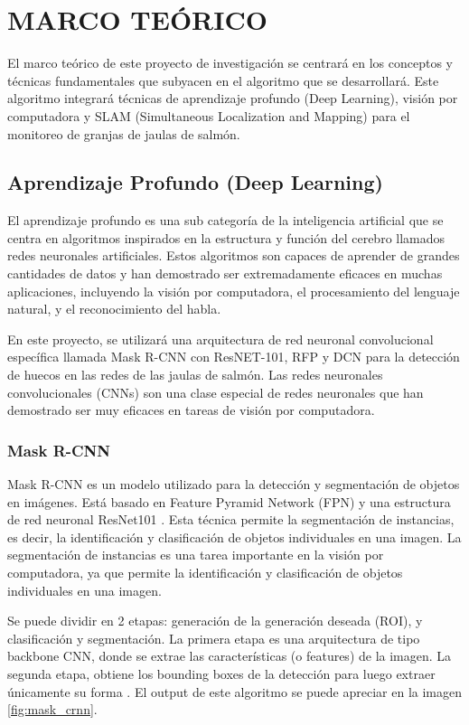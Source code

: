 \chapter{MARCO TEÓRICO}

El marco teórico de este proyecto de investigación se centrará en los conceptos y técnicas fundamentales que subyacen en el algoritmo que se desarrollará. Este algoritmo integrará técnicas de aprendizaje profundo (Deep Learning), visión por computadora y SLAM (Simultaneous Localization and Mapping) para el monitoreo de granjas de jaulas de salmón.

\section{Aprendizaje Profundo (Deep Learning)}

El aprendizaje profundo es una sub categoría de la inteligencia artificial que se centra en algoritmos inspirados en la estructura y función del cerebro llamados redes neuronales artificiales. Estos algoritmos son capaces de aprender de grandes cantidades de datos y han demostrado ser extremadamente eficaces en muchas aplicaciones, incluyendo la visión por computadora, el procesamiento del lenguaje natural, y el reconocimiento del habla.

En este proyecto, se utilizará una arquitectura de red neuronal convolucional específica llamada Mask R-CNN con ResNET-101, RFP y DCN para la detección de huecos en las redes de las jaulas de salmón. Las redes neuronales convolucionales (CNNs) son una clase especial de redes neuronales que han demostrado ser muy eficaces en tareas de visión por computadora. 

\subsection{Mask R-CNN}

Mask R-CNN es un modelo utilizado para la detección y segmentación de objetos en imágenes. Está basado en Feature Pyramid Network (FPN) y una estructura de red neuronal ResNet101 \cite{matterport_maskrcnn_2017}. Esta técnica permite la segmentación de instancias, es decir, la identificación y clasificación de objetos individuales en una imagen. La segmentación de instancias es una tarea importante en la visión por computadora, ya que permite la identificación y clasificación de objetos individuales en una imagen. 


Se puede dividir en 2 etapas: generación de la generación deseada (ROI), y clasificación y segmentación. La primera etapa es una arquitectura de tipo backbone CNN, donde se extrae las características (o features) de la imagen. La segunda etapa, obtiene los bounding boxes de la detección para luego extraer únicamente su forma \cite{cite:Zhang}. El output de este algoritmo se puede apreciar en la imagen \ref{fig:mask_crnn}.

